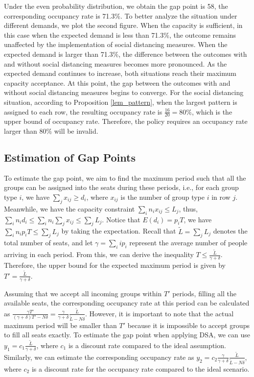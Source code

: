 Under the even probability distribution, we obtain the gap point is 58, the corresponding occupancy rate is 71.3\%. To better analyze the situation under different demands, we plot the second figure. When the capacity is sufficient, in this case when the expected demand is less than 71.3\%, the outcome remains unaffected by the implementation of social distancing measures. When the expected demand is larger than 71.3\%, the difference between the outcomes with and without social distancing measures becomes more pronounced. As the expected demand continues to increase, both situations reach their maximum capacity acceptance. At this point, the gap between the outcomes with and without social distancing measures begins to converge. For the social distancing situation, according to Proposition \ref{lem_pattern}, when the largest pattern is assigned to each row, the resulting occupancy rate is $\frac{16}{20} = 80\%$, which is the upper bound of occupancy rate. Therefore, the policy requires an occupancy rate larger than 80\% will be invalid.

\subsection{Estimation of Gap Points}
To estimate the gap point, we aim to find the maximum period such that all the groups can be assigned into the seats during these periods, i.e., for each group type $i$, we have $\sum_{j} x_{ij} \geq d_i$, where $x_{ij}$ is the number of group type $i$ in row $j$. Meanwhile, we have the capacity constraint $\sum_{i} n_{i} x_{ij} \leq L_j$, thus, $\sum_{i} n_i d_i \leq \sum_{i} n_i \sum_{j} x_{ij} \leq \sum_{j} L_{j}$. Notice that $E(d_i) = p_i T$, we have $\sum_{i} n_i p_i T \leq \sum_{j} L_{j}$ by taking the expectation. Recall that $\tilde{L} = \sum_{j} L_{j}$ denotes the total number of seats, and let $\gamma = \sum_{i} i p_i$ represent the average number of people arriving in each period. From this, we can derive the inequality $T \leq \frac{\tilde{L}}{\gamma + \delta}$. Therefore, the upper bound for the expected maximum period is given by $T' = \frac{\tilde{L}}{\gamma + \delta}$.


Assuming that we accept all incoming groups within $T'$ periods, filling all the available seats, the corresponding occupancy rate at this period can be calculated as $\frac{\gamma T'}{(\gamma+ \delta)T' - N \delta} = \frac{\gamma}{\gamma +\delta} \frac{\tilde{L}}{\tilde{L}-N \delta}$. However, it is important to note that the actual maximum period will be smaller than $T{'}$ because it is impossible to accept groups to fill all seats exactly. To estimate the gap point when applying DSA, we can use $y_1 = c_1 \frac{\tilde{L}}{\gamma + \delta}$, where $c_1$ is a discount rate compared to the ideal assumption. Similarly, we can estimate the corresponding occupancy rate as $y_2 = c_2 \frac{\gamma}{\gamma +\delta} \frac{\tilde{L}}{\tilde{L}-N \delta}$, where $c_2$ is a discount rate for the occupancy rate compared to the ideal scenario.

